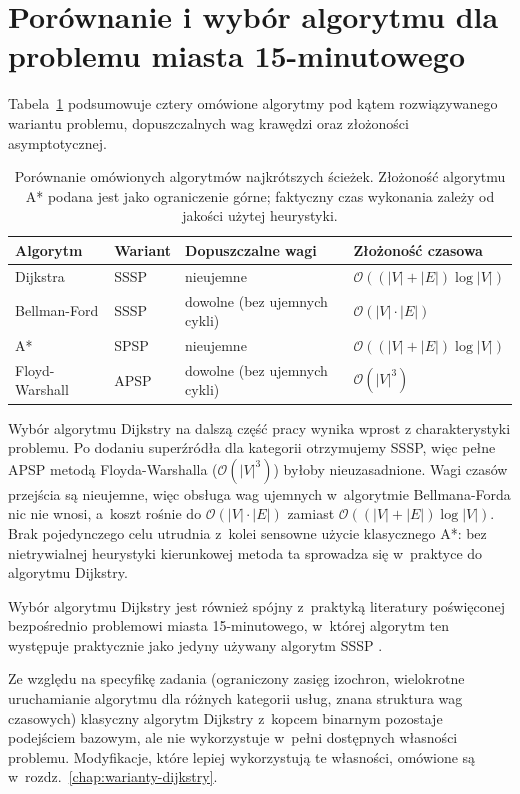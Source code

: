 \section{Porównanie i wybór algorytmu dla problemu miasta 15-minutowego}
\label{sec:sssp:porownanie}

Tabela~\ref{tab:sssp_porownanie} podsumowuje cztery omówione algorytmy
pod kątem rozwiązywanego wariantu problemu, dopuszczalnych wag krawędzi
oraz złożoności asymptotycznej.

\begin{table}[ht]
\centering
\caption{Porównanie omówionych algorytmów najkrótszych ścieżek.
Złożoność algorytmu A* podana jest jako ograniczenie górne;
faktyczny czas wykonania zależy od jakości użytej heurystyki.}
\label{tab:sssp_porownanie}
\begin{tabular}{l l l l}
\hline
\textbf{Algorytm} & \textbf{Wariant} & \textbf{Dopuszczalne wagi} & \textbf{Złożoność czasowa} \\
\hline
Dijkstra            & SSSP & nieujemne                    & $\mathcal{O}((|V|+|E|)\log|V|)$ \\
Bellman-Ford        & SSSP & dowolne (bez ujemnych cykli) & $\mathcal{O}(|V|\cdot|E|)$      \\
A*                  & SPSP & nieujemne                    & $\mathcal{O}((|V|+|E|)\log|V|)$ \\
Floyd-Warshall      & APSP & dowolne (bez ujemnych cykli) & $\mathcal{O}(|V|^3)$            \\
\hline
\end{tabular}
\end{table}

Wybór algorytmu Dijkstry na dalszą część pracy wynika wprost z charakterystyki problemu.
Po dodaniu superźródła dla kategorii otrzymujemy SSSP, więc
pełne APSP metodą Floyda-Warshalla ($\mathcal{O}(|V|^3)$) byłoby
nieuzasadnione. Wagi czasów przejścia są nieujemne, więc obsługa wag
ujemnych w~algorytmie Bellmana-Forda nic nie wnosi, a~koszt rośnie do
$\mathcal{O}(|V|\cdot|E|)$ zamiast $\mathcal{O}((|V|+|E|)\log|V|)$.
Brak pojedynczego celu utrudnia z~kolei sensowne użycie klasycznego A*:
bez nietrywialnej heurystyki kierunkowej metoda ta sprowadza się w~praktyce
do algorytmu Dijkstry.

Wybór algorytmu Dijkstry jest również spójny z~praktyką literatury
poświęconej bezpośrednio problemowi miasta 15-minutowego, w~której algorytm
ten występuje praktycznie jako jedyny używany algorytm SSSP
\cite{Lam2024,barbieri2023graph,olivari2023presenting}.

Ze względu na specyfikę zadania (ograniczony zasięg izochron, wielokrotne
uruchamianie algorytmu dla różnych kategorii usług, znana struktura
wag czasowych) klasyczny algorytm Dijkstry z~kopcem binarnym pozostaje
podejściem bazowym, ale nie wykorzystuje w~pełni dostępnych własności
problemu. Modyfikacje, które lepiej wykorzystują te własności,
omówione są w~rozdz.~\ref{chap:warianty-dijkstry}.
